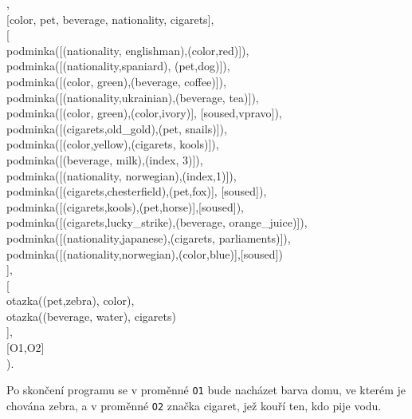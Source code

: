 \documentclass[11pt]{article} %
\begin{document}
\leftskip=50pt
{\ttfamily
		   , \\
		     {[color, pet, beverage, nationality, cigarets],}\\
		    {[}\\
		     podminka([(nationality, englishman),(color,red)]),\\
		     podminka([(nationality,spaniard), (pet,dog)]),\\
		     podminka([(color, green),(beverage, coffee)]),\\
		     podminka([(nationality,ukrainian),(beverage, tea)]),\\
		     podminka([(color, green),(color,ivory)], [soused,vpravo]),\\
		     podminka([(cigarets,old\_gold),(pet, snails)]),\\
		     podminka([(color,yellow),(cigarets, kools)]),\\
		     podminka([(beverage, milk),(index, 3)]),\\
		     podminka([(nationality, norwegian),(index,1)]),\\
		     podminka([(cigarets,chesterfield),(pet,fox)], [soused]),\\
		     podminka([(cigarets,kools),(pet,horse)],[soused]),\\
		     podminka([(cigarets,lucky\_strike),(beverage, orange\_juice)]),\\
		     podminka([(nationality,japanese),(cigarets, parliaments)]),\\
		     podminka([(nationality,norwegian),(color,blue)],[soused])\\
		   { ]},\\
		    {[}\\
		     otazka((pet,zebra), color),\\
		     otazka((beverage, water), cigarets)\\
		    ],\\
		    {[O1,O2]}\\
		     ).\\
}
\par
\endgroup
\noindent Po skončení programu se v proměnné \texttt{O1} bude nacházet barva domu, ve kterém je chována zebra, a v proměnné \texttt{O2} značka cigaret, jež kouří ten, kdo pije vodu.
\end{document}

